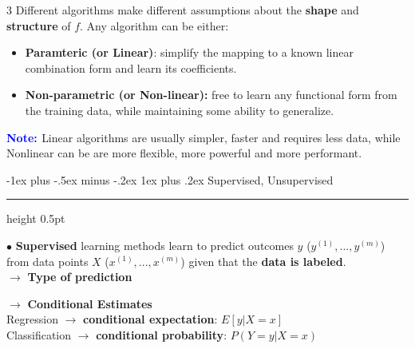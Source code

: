 \documentclass[letterpaper, 10.5pt,landscape]{article}
\makeatletter
\renewcommand{\subsubsection}{\@startsection{subsubsection}{3}{0mm}%
                                {-1ex plus -.5ex minus -.2ex}%
                                {1ex plus .2ex}%
                                {\normalfont\small\bfseries}}
\makeatother
\begin{document}
\begin{multicols*}{3}
Different algorithms make different assumptions about the
\textbf{shape} and \textbf{structure} of $f$. Any algorithm can be either:
\begin{itemize}[leftmargin=0.4cm]
    \vspace{-2pt}
    \item \textbf{Paramteric (or Linear)}: simplify the mapping to a known linear combination form and learn its coefficients.
    \vspace{-2pt}
    \item \textbf{Non-parametric (or Non-linear):} free to learn any functional form from the training data, while maintaining some ability to generalize.
\end{itemize}

\textbf{\textcolor{blue}{Note: }} Linear algorithms are usually simpler, faster and requires
less data, while Nonlinear can be are more flexible, more powerful and more performant.

\subsubsection{Supervised, Unsupervised} {\color{teal}\hrule height 0.5pt} \smallskip

$\bullet$ \textbf{Supervised} learning methods learn to predict outcomes $y$ (\(y^{(1)}, ..., y^{(m)}\)) from data points $X$ (\(x^{(1)}, ..., x^{(m)}\)) given that the \textbf{data is labeled}. \\

$\rightarrow$ \textbf{Type of prediction}
\vspace{-5pt}
\begin{center}
        \footnotesize
\end{center}

\vspace{-3pt}
$\rightarrow$ \textbf{Conditional Estimates} \\
Regression $\rightarrow$ \textbf{conditional expectation}: \(E \left[y|X=x \right] \) \\
Classification $\rightarrow$ \textbf{conditional probability}: \(P(Y=y | X=x) \)


\end{multicols*}
\end{document}
